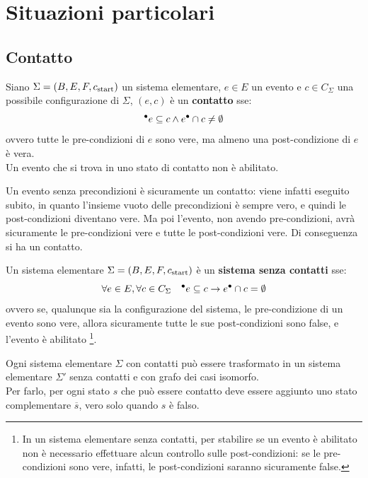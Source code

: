 \section{Situazioni particolari}
\subsection{Contatto}
\begin{defn}
    Siano $\Sigma = (B, E, F, c_{\textnormal{start}})$ un sistema elementare, $e \in E$ un evento e $c \in C_{\Sigma}$ una possibile configurazione di $\Sigma$, $(e, c)$ è un \textbf{contatto} sse:
    \[
        {^\bullet}e \subseteq c \land e^\bullet \cap c \neq \emptyset
    \]
    ovvero tutte le pre-condizioni di $e$ sono vere, ma almeno una post-condizione di $e$ è vera.\\
    Un evento che si trova in uno stato di contatto non è abilitato.
\end{defn}

\begin{rem}
    Un evento senza precondizioni è sicuramente un contatto: viene infatti eseguito subito, in quanto l'insieme vuoto delle precondizioni è sempre vero, e quindi le post-condizioni diventano vere. Ma poi l'evento, non avendo pre-condizioni, avrà sicuramente le pre-condizioni vere e tutte le post-condizioni vere. Di conseguenza si ha un contatto. 
\end{rem}

\begin{defn}
    Un sistema elementare $\Sigma = (B, E, F, c_{\textnormal{start}})$ è un \textbf{sistema senza contatti} sse:
    \[
        \forall e \in E, \forall c \in C_{\Sigma} \quad {^\bullet}e \subseteq c \rightarrow e^\bullet \cap c = \emptyset
    \]
    ovvero se, qualunque sia la configurazione del sistema, le pre-condizione di un evento sono vere, allora sicuramente tutte le sue post-condizioni sono false, e l'evento è abilitato \footnote{In un sistema elementare senza contatti, per stabilire se un evento è abilitato non è necessario effettuare alcun controllo sulle post-condizioni: se le pre-condizioni sono vere, infatti, le post-condizioni saranno sicuramente false.}.
\end{defn}

\begin{rem}
    Ogni sistema elementare $\Sigma$ con contatti può essere trasformato in un sistema elementare $\Sigma'$ senza contatti e con grafo dei casi isomorfo.\\
    Per farlo, per ogni stato $s$ che può essere contatto deve essere aggiunto uno stato complementare $\overline{s}$, vero solo quando $s$ è falso. 
\end{rem}


